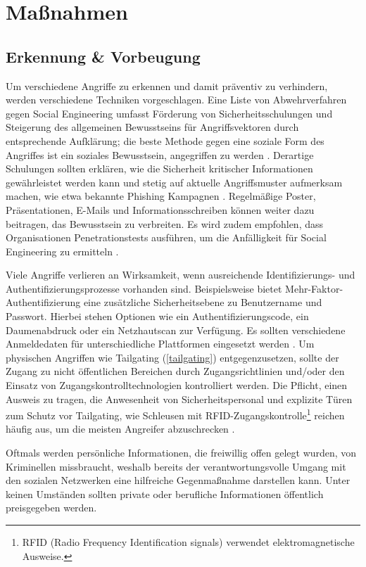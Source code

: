 \chapter{Maßnahmen}
\label{chapter:massnahmen}

\section{Erkennung \& Vorbeugung}

Um verschiedene Angriffe zu erkennen und damit präventiv zu verhindern, werden verschiedene Techniken vorgeschlagen.
Eine Liste von Abwehrverfahren gegen Social Engineering umfasst Förderung von Sicherheitsschulungen und Steigerung des allgemeinen Bewusstseins für Angriffsvektoren durch entsprechende Aufklärung;
die beste Methode gegen eine soziale Form des Angriffes ist ein soziales Bewusstsein, angegriffen zu werden .
Derartige Schulungen sollten erklären, wie die Sicherheit kritischer Informationen gewährleistet werden kann und stetig auf aktuelle Angriffsmuster aufmerksam machen, wie etwa bekannte Phishing Kampagnen .
Regelmäßige Poster, Präsentationen, E-Mails und Informationsschreiben können weiter dazu beitragen, das Bewusstsein zu verbreiten.
Es wird zudem empfohlen, dass Organisationen Penetrationstests ausführen, um die Anfälligkeit für Social Engineering zu ermitteln .

Viele Angriffe verlieren an Wirksamkeit, wenn ausreichende Identifizierungs- und Authentifizierungsprozesse vorhanden sind.
Beispielsweise bietet Mehr-Faktor-Authentifizierung eine zusätzliche Sicherheitsebene zu Benutzername und Passwort.
Hierbei stehen Optionen wie ein Authentifizierungscode, ein Daumenabdruck oder ein Netzhautscan zur Verfügung.
Es sollten verschiedene Anmeldedaten für unterschiedliche Plattformen eingesetzt werden .
Um physischen Angriffen wie Tailgating (\autoref{tailgating}) entgegenzusetzen, sollte der Zugang zu nicht öffentlichen Bereichen durch Zugangsrichtlinien und/oder den Einsatz von Zugangskontrolltechnologien kontrolliert werden.
Die Pflicht, einen Ausweis zu tragen, die Anwesenheit von Sicherheitspersonal und explizite Türen zum Schutz vor Tailgating,
wie Schleusen mit RFID-Zugangskontrolle\footnote{RFID (Radio Frequency Identification signals) verwendet elektromagnetische Ausweise.} reichen häufig aus, um die meisten Angreifer abzuschrecken .

Oftmals werden persönliche Informationen, die freiwillig offen gelegt wurden, von Kriminellen missbraucht, weshalb bereits der verantwortungsvolle Umgang mit den sozialen Netzwerken eine hilfreiche Gegenmaßnahme darstellen kann.
Unter keinen Umständen sollten private oder berufliche Informationen öffentlich preisgegeben werden.

